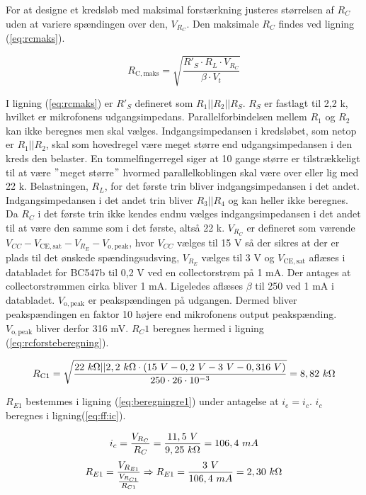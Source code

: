For at designe et kredsløb med maksimal forstærkning justeres størrelsen af $R_C$ uden at variere spændingen over den, $V_{R_C}$. Den maksimale $R_C$ findes ved ligning (\ref{eq:rcmaks}).

\begin{equation}
R_{\mathrm{C,maks}} = \sqrt{\frac{R'_S \cdot R_L \cdot V_{R_C}}{\beta \cdot V_t}}
\label{eq:rcmaks}
\end{equation}

I ligning (\ref{eq:rcmaks}) er $R'_S$ defineret som $R_1||R_2||R_S$. $R_S$ er fastlagt til 2,2 k\ohm, hvilket er mikrofonens udgangsimpedans. Parallelforbindelsen mellem $R_1$ og $R_2$ kan ikke beregnes men skal vælges. Indgangsimpedansen i kredsløbet, som netop er $R_1||R_2$, skal som hovedregel være meget større end udgangsimpedansen i den kreds den belaster. En tommelfingerregel siger at 10 gange større er tilstrækkeligt til at være $"$meget større$"$ hvormed parallelkoblingen skal være over eller lig med 22 k\ohm. 
Belastningen, $R_L$, for det første trin bliver indgangsimpedansen i det andet. Indgangsimpedansen i det andet trin bliver $R_3||R_4$ og kan heller ikke beregnes. Da $R_C$ i det første trin ikke kendes endnu vælges indgangsimpedansen i det andet til at være den samme som i det første, altså 22 k\ohm. 
$V_{R_C}$ er defineret som værende $V_{CC} - V_{\mathrm{CE,sat}} - V_{R_E} - V_{\mathrm{o,peak}}$, hvor $V_{CC}$ vælges til 15 V så der sikres at der er plads til det ønskede spændingsudsving, $V_{R_E}$ vælges til 3 V og $V_{\mathrm{CE,sat}}$ aflæses i databladet for BC547b til 0,2 V ved en collectorstrøm på 1 mA. Der antages at collectorstrømmen cirka bliver 1 mA. Ligeledes aflæses $\beta$ til 250 ved 1 mA i databladet. $V_{\mathrm{o,peak}}$ er peakspændingen på udgangen. Dermed bliver peakspændingen en faktor 10 højere end mikrofonens output peakspænding. $V_{\mathrm{o,peak}}$ bliver derfor 316 mV. $R_C1$ beregnes hermed i ligning (\ref{eq:rcforsteberegning}).

\begin{equation}
R_{\mathrm{C1}} = \sqrt{\frac{22~k\ohm || 2,2~k\ohm \cdot (15~V - 0,2~V - 3~V - 0,316~V)}{250 \cdot 26 \cdot 10^{-3}}}=8,82~k\ohm
\label{eq:rcforsteberegning}
\end{equation}

$R_{E1}$ bestemmes i ligning (\ref{eq:beregningre1}) under antagelse at $i_e = i_c$.  $i_c$ beregnes i ligning(\ref{eq:ff:ic}).

\begin{equation}
\label{eq:ff:ic}
i_c=\frac{V_{R_C}}{R_C}=\frac{11,5~V}{9,25~k\ohm}=106,4~mA
\end{equation}
\begin{equation}
R_{E1}=\frac{V_{R_{E1}}}{\frac{V_{R_{C1}}}{R_{C1}}}  \Rightarrow R_{E1}=\frac{3~V}{106,4~mA}=2,30~k\ohm
\label{eq:beregningre1}
\end{equation}


